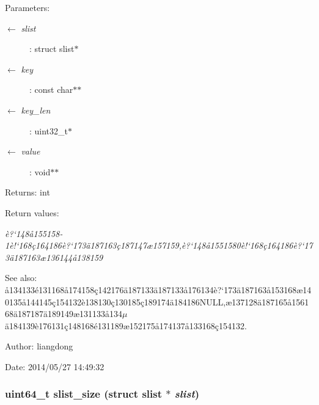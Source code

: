 \begin{Desc}
\item[Parameters:]
\begin{description}
\item[\mbox{$\leftarrow$} {\em slist}]: struct slist$\ast$ \item[\mbox{$\leftarrow$} {\em key}]: const char$\ast$$\ast$ \item[\mbox{$\leftarrow$} {\em key\_\-len}]: uint32\_\-t$\ast$ \item[\mbox{$\leftarrow$} {\em value}]: void$\ast$$\ast$ \end{description}
\end{Desc}
\begin{Desc}
\item[Returns:]int \end{Desc}
\begin{Desc}
\item[Return values:]
\begin{description}
\item[{\em \`{e}?`148\aa{}155158-1\`{e}!`168\c{c}164186\`{e}?`173\"{a}187163\c{c}187147\ae{}157159,\`{e}?`148\aa{}1551580\`{e}!`168\c{c}164186\`{e}?`173\"{a}187163\ae{}136144\aa{}138159}]\end{description}
\end{Desc}
\begin{Desc}
\item[See also:]\aa{}134133\'{e}131168\aa{}174158\c{c}142176\"{a}187133\"{a}187133\aa{}176134\`{e}?`173\"{a}187163\aa{}153168\ae{}140135\aa{}144145\c{c}154132\`{e}138130\c{c}130185\c{c}189174\"{a}184186NULL,\ae{}137128\"{a}187165\aa{}156168\"{a}187187\"{a}189149\ae{}131133\aa{}134$\mu$\"{a}184139\`{e}176131\c{c}148168\'{e}131189\ae{}152175\aa{}174137\aa{}133168\c{c}154132. \end{Desc}
\begin{Desc}
\item[Author:]liangdong \end{Desc}
\begin{Desc}
\item[Date:]2014/05/27 14:49:32 \end{Desc}
\subsubsection{\setlength{\rightskip}{0pt plus 5cm}uint64\_\-t slist\_\-size (struct slist $\ast$ {\em slist})}\label{slist_8h_a9}


